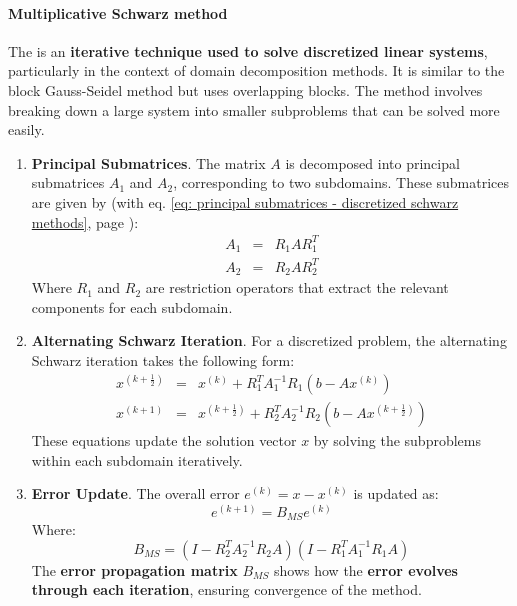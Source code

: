 \paragraph{Multiplicative Schwarz method}

The  is an \textbf{iterative technique used to solve discretized linear systems}, particularly in the context of domain decomposition methods. It is similar to the block Gauss-Seidel method but uses overlapping blocks. The method involves breaking down a large system into smaller subproblems that can be solved more easily.

\begin{enumerate}
    \item \textbf{Principal Submatrices}. The matrix $A$ is decomposed into principal submatrices $A_{1}$ and $A_{2}$, corresponding to two subdomains. These submatrices are given by (with eq. \ref{eq: principal submatrices - discretized schwarz methods}, page \pageref{eq: principal submatrices - discretized schwarz methods}):
    \begin{equation*}
        \begin{array}{rcl}
            A_{1} &=& R_{1} A R_{1}^{T} \\ [.5em]
            A_{2} &=& R_{2} A R_{2}^{T}
        \end{array}
    \end{equation*}
    Where $R_{1}$ and $R_{2}$ are restriction operators that extract the relevant components for each subdomain.

    \item \textbf{Alternating Schwarz Iteration}. For a discretized problem, the alternating Schwarz iteration takes the following form:
    \begin{equation*}
        \begin{array}{rcl}
            x^{\left(k+\frac{1}{2}\right)} &=& x^{(k)} + R_{1}^{T} A_{1}^{-1} R_{1} \left(b - A x^{(k)}\right) \\ [.5em]
            x^{(k+1)} &=& x^{\left(k+\frac{1}{2}\right)} + R_{2}^{T} A_{2}^{-1} R_{2} \left(b - A x^{\left(k+\frac{1}{2}\right)}\right)
        \end{array}
    \end{equation*}
    These equations update the solution vector $x$ by solving the subproblems within each subdomain iteratively.

    \item \textbf{Error Update}. The overall error $e^{(k)} = x - x^{(k)}$ is updated as:
    \begin{equation*}
        e^{(k+1)} = B_{MS} e^{(k)}
    \end{equation*}
    Where:
    \begin{equation*}
        B_{MS} = \left(I - R_{2}^{T} A_{2}^{-1} R_{2} A\right)\left(I - R_{1}^{T} A_{1}^{-1} R_{1} A\right)
    \end{equation*}
    The \textbf{error propagation matrix} $B_{MS}$ shows how the \textbf{error evolves through each iteration}, ensuring convergence of the method.
\end{enumerate}

